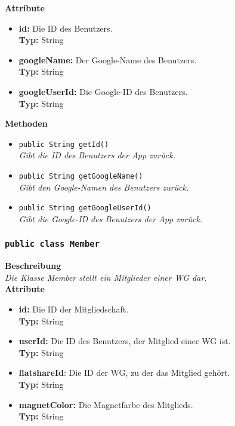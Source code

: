 	\textbf{Attribute}
	\begin{itemize}
		\item \textbf{id:} Die ID des Benutzers. \\
		\textbf{Typ:} String
		\item \textbf{googleName:} Der Google-Name des Benutzers. \\
		\textbf{Typ:} String
		\item \textbf{googleUserId:} Die Google-ID des Benutzers. \\
		\textbf{Typ:} String
	\end{itemize}

	\textbf{Methoden}
	\begin{itemize}
	\item{\texttt{public String getId()}}\\
	\textit{Gibt die ID des Benutzers der App zurück.}\\
	\item{\texttt{public String getGoogleName()}}\\
	\textit{Gibt den Google-Namen des Benutzers zurück.}\\
	
	\item{\texttt{public String getGoogleUserId()}}\\
	\textit{Gibt die Google-ID des Benutzers der App zurück.}\\
	\end{itemize}

	

\subsubsection{\texttt{public class Member}}

	\textbf{Beschreibung} \\
	\textit{Die Klasse Member stellt ein Mitglieder einer WG dar.} \\
	
	\textbf{Attribute}
	\begin{itemize}
		\item \textbf{id:} Die ID der Mitgliedschaft. \\
		\textbf{Typ:} String
		\item \textbf{userId:} Die ID des Benutzers, der Mitglied einer WG ist. \\
		\textbf{Typ:} String
		\item \textbf{flatshareId}: Die ID der WG, zu der das Mitglied gehört. \\
		\textbf{Typ:} String
		\item \textbf{magnetColor:} Die Magnetfarbe des Mitglieds. \\
		\textbf{Typ:} String
	\end{itemize}

